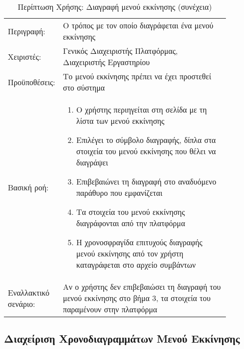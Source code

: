 %
%
\begin{longtable}{|p{0.14\linewidth}|p{0.76\linewidth}|}
	\caption{Περίπτωση Χρήσης: Διαγραφή μενού εκκίνησης} \label{tab:use-case-delete-boot-menu} \\ \hline \endfirsthead
	\caption[{}]{Περίπτωση Χρήσης: Διαγραφή μενού εκκίνησης (συνέχεια)} \\ \endhead \endfoot
	Περιγραφή: & Ο τρόπος με τον οποίο διαγράφεται ένα μενού εκκίνησης \\ \hline
	Χειριστές: & Γενικός Διαχειριστής Πλατφόρμας, Διαχειριστής Εργαστηρίου \\ \hline
	Προϋποθέσεις: & Το μενού εκκίνησης πρέπει να έχει προστεθεί στο σύστημα \\ \hline
	Βασική ροή: &
	\begin{enumerate}
		\vspace{-1cm}
		\addtolength{\itemindent}{-0.4cm}
		\item Ο χρήστης περιηγείται στη σελίδα με τη λίστα των μενού εκκίνησης
		\item Επιλέγει το σύμβολο διαγραφής, δίπλα στα στοιχεία του μενού εκκίνησης που θέλει να διαγράψει
		\item Επιβεβαιώνει τη διαγραφή στο αναδυόμενο παράθυρο που εμφανίζεται
		\item Τα στοιχεία του μενού εκκίνησης διαγράφονται από την πλατφόρμα
		\item Η χρονοσφραγίδα επιτυχούς διαγραφής μενού εκκίνησης από τον χρήστη καταγράφεται στο αρχείο συμβάντων
		\vspace{-0.7cm}
	\end{enumerate} \\ \hline
	Εναλλακτικό σενάριο: & Αν ο χρήστης δεν επιβεβαιώσει τη διαγραφή του μενού εκκίνησης στο βήμα 3, τα στοιχεία του παραμένουν στην πλατφόρμα \\ \hline
\end{longtable}

\subsection{Διαχείριση Χρονοδιαγραμμάτων Μενού Εκκίνησης}

